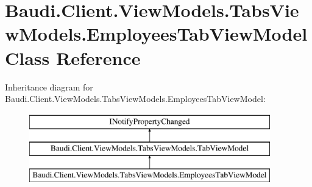 \hypertarget{class_baudi_1_1_client_1_1_view_models_1_1_tabs_view_models_1_1_employees_tab_view_model}{}\section{Baudi.\+Client.\+View\+Models.\+Tabs\+View\+Models.\+Employees\+Tab\+View\+Model Class Reference}
\label{class_baudi_1_1_client_1_1_view_models_1_1_tabs_view_models_1_1_employees_tab_view_model}
Inheritance diagram for Baudi.\+Client.\+View\+Models.\+Tabs\+View\+Models.\+Employees\+Tab\+View\+Model\+:\begin{figure}[H]
\begin{center}
\leavevmode
\includegraphics[height=3.000000cm]{class_baudi_1_1_client_1_1_view_models_1_1_tabs_view_models_1_1_employees_tab_view_model}
\end{center}
\end{figure}
